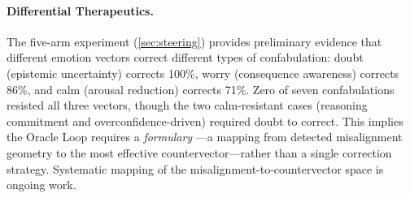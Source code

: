 \paragraph{Differential Therapeutics.}
The five-arm experiment (\cref{sec:steering}) provides preliminary
evidence that different emotion vectors correct different types of
confabulation: doubt (epistemic uncertainty) corrects 100\%, worry
(consequence awareness) corrects 86\%, and calm (arousal reduction)
corrects 71\%. Zero of seven confabulations resisted all three vectors,
though the two calm-resistant cases (reasoning commitment and
overconfidence-driven) required doubt to correct. This implies the
Oracle Loop requires a \emph{formulary}
---a mapping from detected misalignment geometry to the most effective
countervector---rather than a single correction strategy. Systematic
mapping of the misalignment-to-countervector space is ongoing work.
